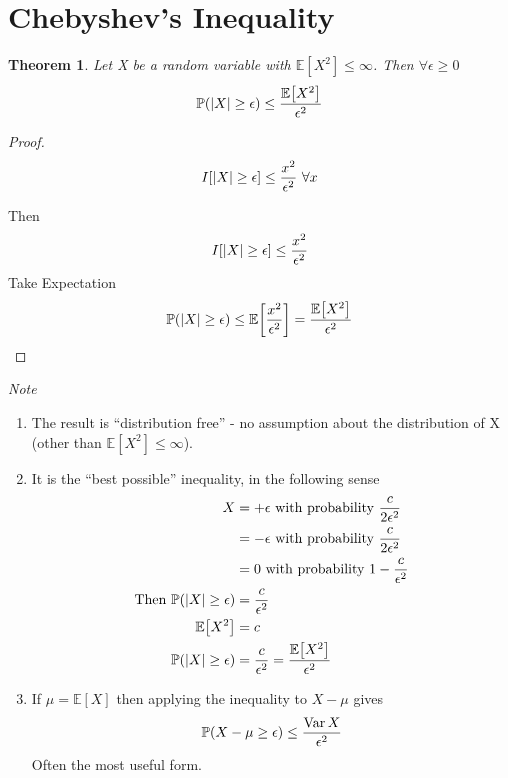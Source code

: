\documentclass{notes}
\theoremstyle{plain}
\newtheorem{theorem}{Theorem}[chapter]
\newcommand{\bP}{\mathbb{P}}
\newcommand{\bE}{\mathbb{E}}
\newcommand{\prob}[1]{\bP \negthinspace\left(#1\right)}
\newcommand{\expect}[1]{\bE\!\left[#1\right]}
\DeclareMathOperator{\var}{Var}
\begin{document}
\section{Chebyshev's Inequality}
\begin{theorem}
Let X be a random variable with $\expect{X^2} \le \infty$. Then $\forall \epsilon \ge 0 $
\[
\prob{\abs{X}\geq \epsilon} \leq \frac{\expect{X^2}}{\epsilon^2}
\]
\end{theorem}
\begin{proof}
\[
I[\left|X\right| \geq \epsilon] \leq \frac{x^2}{\epsilon^2}\text{ } \forall x
\]

\vspace{3in}
Then
\[
I[\left|X\right| \geq \epsilon] \leq \frac{x^2}{\epsilon^2}
\]
Take Expectation
\[
\prob{\abs{X} \geq \epsilon} \leq \expect{\frac{x^2}{\epsilon^2}} = 
\frac{\expect{X^2}}{\epsilon^2}
\]
\end{proof}
\emph{Note}
\begin{enumerate}
\item The result is  ``distribution free'' - no assumption about the distribution of X (other than $\expect{X^2} \le \infty$).
\item It is the ``best possible'' inequality, in the following sense
\begin{align*}
X&= +\epsilon \text{ with probability } \frac{c}{2\epsilon^2}\\
&= -\epsilon \text{ with probability } \frac{c}{2\epsilon^2}\\
&= 0 \text{ with probability } 1 - \frac{c}{\epsilon^2}\\
\text{Then } \prob{\abs{X} \geq \epsilon} &= \frac{c}{\epsilon^2}\\
\expect{X^2} &= c\\
\prob{\abs{X} \geq \epsilon} &= \frac{c}{\epsilon^2} = \frac{\expect{X^2}}{\epsilon^2}
\end{align*}
\item If $\mu=\expect{X}$ then applying the inequality to $X - \mu$ gives
\[
\prob{X-\mu \geq \epsilon} \leq \frac{\var X}{\epsilon^2}
\]
Often the most useful form.
\end{enumerate}
\end{document}
